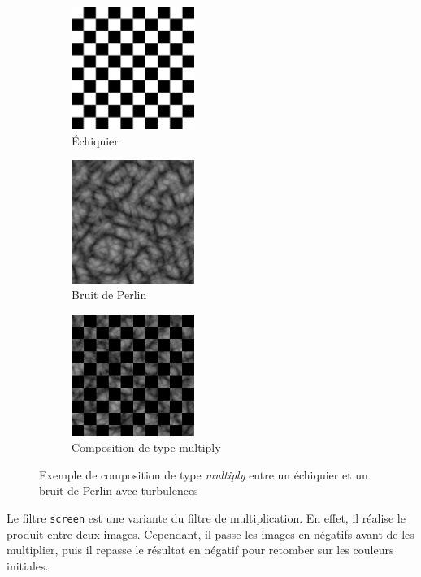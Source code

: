\documentclass[11pt]{article}
\begin{document}
\begin{figure}[H]
    \centering
    \begin{subfigure}{0.3\textwidth}
    \centering
            \includegraphics[width=4cm]{multiplyInit1.png}
        \caption{\'Echiquier}
        \label{fig:chessboard}
    \end{subfigure}
    \begin{subfigure}{0.3\textwidth}
    \centering
        \includegraphics[width=4cm]{multiplyInit2.png}
        \caption{Bruit de Perlin}
        \label{fig:perlinnoise}
    \end{subfigure}
    \begin{subfigure}{0.3\textwidth}
    \centering
        \includegraphics[width=4cm]{multiplyFinal.png}
        \caption{Composition de type multiply}
        \label{fig:chessboard_x_perlin_noise}
    \end{subfigure}
    \caption{Exemple de composition de type \textit{multiply} entre un échiquier et un bruit de Perlin avec turbulences}
    \label{fig:multiply}
\end{figure}

Le filtre \texttt{screen} est une variante du filtre de multiplication. En effet, il réalise le produit entre deux images. Cependant, il passe les images en négatifs avant de les multiplier, puis il repasse le résultat en négatif pour retomber sur les couleurs initiales. \\
\end{document}
